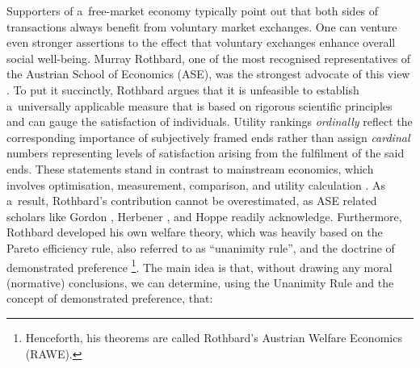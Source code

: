 Supporters of a~free-market economy typically point out that both sides of transactions always benefit from voluntary market exchanges. One can venture even stronger assertions to the effect that voluntary exchanges enhance overall social well-being. Murray Rothbard, one of the most recognised representatives of the Austrian School of Economics (ASE), was the strongest advocate of this view 
\parencites[][]{rothbard_ethics_1998}[][]{}[][]{}. %
 To put it succinctly, Rothbard argues that it is unfeasible to establish a~universally applicable measure that is based on rigorous scientific principles and can gauge the satisfaction of individuals. Utility rankings \textit{ordinally} reflect the corresponding importance of subjectively framed ends rather than assign \textit{cardinal} numbers representing levels of satisfaction arising from the fulfilment of the said ends. These statements stand in contrast to mainstream economics, which involves optimisation, measurement, comparison, and utility calculation 
\parencite[][pp.173–183]{}. %
 As a~result, Rothbard's contribution cannot be overestimated, as ASE related scholars like Gordon 
\parencite*[][]{gordon_toward_1993}, %
 Herbener 
\parencite*[][]{herbener_pareto_1997}, %
 and Hoppe 
\parencite*[][]{} %
 readily acknowledge. Furthermore, Rothbard developed his own welfare theory, which was heavily based on the Pareto efficiency rule, also referred to as ``unanimity rule'', and the doctrine of demonstrated preference 
\parencite[][]{rothbard_toward_2008}%
\footnote{Henceforth, his theorems are called Rothbard's Austrian Welfare Economics (RAWE).}. The main idea is that, without drawing any moral (normative) conclusions, we can determine, using the Unanimity Rule and the concept of demonstrated preference, that:



\begin{enumerate}

\item {\color{black}

Free-market (voluntary) transactions always improve society's welfare.

\item {\color{black}

Government interference can never raise social welfare.

\end{enumerate}

